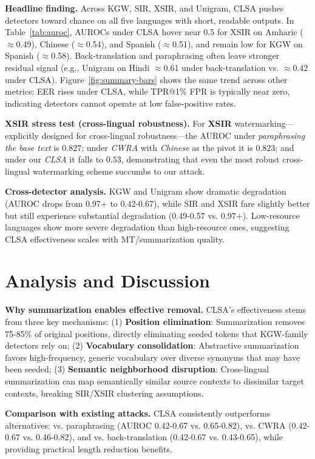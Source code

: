 \documentclass{article}
\begin{document}
\textbf{Headline finding.}
Across KGW, SIR, XSIR, and Unigram, CLSA pushes detectors toward chance on all five languages with short, readable outputs. In Table~\ref{tab:auroc}, AUROCs under CLSA hover near 0.5 for XSIR on Amharic ($\approx$0.49), Chinese ($\approx$0.54), and Spanish ($\approx$0.51), and remain low for KGW on Spanish ($\approx$0.58). Back-translation and paraphrasing often leave stronger residual signal (e.g., Unigram on Hindi $\approx$0.61 under back-translation vs. $\approx$0.42 under CLSA). Figure~\ref{fig:summary-bars} shows the same trend across other metrics: EER rises under CLSA, while TPR@1\% FPR is typically near zero, indicating detectors cannot operate at low false-positive rates.

\textbf{XSIR stress test (cross-lingual robustness).}
For \textbf{XSIR} watermarking—explicitly designed for cross-lingual robustness—the AUROC under \emph{paraphrasing the base text} is $0.827$; under \emph{CWRA} with \emph{Chinese} as the pivot it is $0.823$; and under our \emph{CLSA} it falls to $0.53$, demonstrating that even the most robust cross-lingual watermarking scheme succumbs to our attack.

\textbf{Cross-detector analysis.}
KGW and Unigram show dramatic degradation (AUROC drops from 0.97+ to 0.42-0.67), while SIR and XSIR fare slightly better but still experience substantial degradation (0.49-0.57 vs. 0.97+). Low-resource languages show more severe degradation than high-resource ones, suggesting CLSA effectiveness scales with MT/summarization quality.

\section{Analysis and Discussion}

\textbf{Why summarization enables effective removal.}
CLSA's effectiveness stems from three key mechanisms: (1) \textbf{Position elimination}: Summarization removes 75-85\% of original positions, directly eliminating seeded tokens that KGW-family detectors rely on; (2) \textbf{Vocabulary consolidation}: Abstractive summarization favors high-frequency, generic vocabulary over diverse synonyms that may have been seeded; (3) \textbf{Semantic neighborhood disruption}: Cross-lingual summarization can map semantically similar source contexts to dissimilar target contexts, breaking SIR/XSIR clustering assumptions.

\textbf{Comparison with existing attacks.}
CLSA consistently outperforms alternatives: vs. paraphrasing (AUROC 0.42-0.67 vs. 0.65-0.82), vs. CWRA (0.42-0.67 vs. 0.46-0.82), and vs. back-translation (0.42-0.67 vs. 0.43-0.65), while providing practical length reduction benefits.
\end{document}
